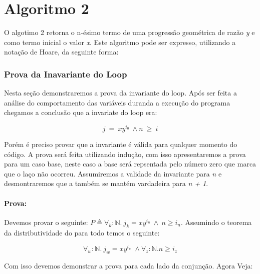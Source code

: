 \newpage

\section{Algoritmo 2}
\label{sec:algo2}

O algotimo 2 retorna o n-ésimo termo de uma progressão geométrica de razão
\emph{y} e como termo inicial o valor \emph{x}. Este algoritmo pode ser
expresso, utilizando a notação de Hoare, da seguinte forma:

\subsubsection{Prova da Inavariante do Loop}

Nesta seção demonstraremos a prova da invariante do loop. Após ser feita a
análise do comportamento das variáveis duranda a execução do programa chegamos a
conclusão que a invariate do loop era:

$$ j\  =\ xy^{i_0}\ \land n\ \geq\ i $$

Porém é preciso provar que a invariante é válida para qualquer momento do
código. A prova será feita utilizando indução, com isso apresentaremos a prova
para um caso base, neste caso a base será repsentada pelo número zero que marca
que o laço não ocorreu. Assumiremos a validade da invariante para \emph{n} e
desmontraremos que a também se mantém vardadeira para \emph{n + 1}.

\paragraph{Prova:} 
Devemos provar o seguinte: $P \triangleq \forall_k :\mathbb{N} .\ j_k=xy^{i_n}\ \land\
n \geq i_n$. Assumindo o teorema da distributividade do para todo temos o
seguinte:

$$\forall_w :\mathbb{N}.\ j_w=xy^{i_w}\ \land  \forall_z:\mathbb{N}. n \geq i_z$$

Com isso devemos demonstrar a prova para cada lado da conjunção. Agora Veja:

